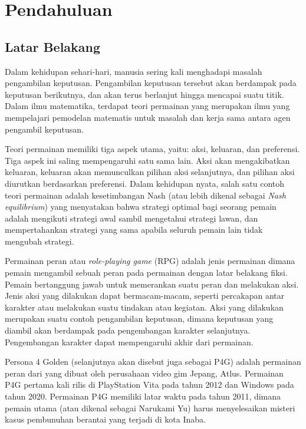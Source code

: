 \chapter{Pendahuluan}

\section{Latar Belakang}
\label{sec:latarbelakang}

Dalam kehidupan sehari-hari, manusia sering kali menghadapi masalah pengambilan keputusan. Pengambilan keputusan tersebut akan berdampak pada keputusan berikutnya, dan akan terus berlanjut hingga mencapai suatu titik. Dalam ilmu matematika, terdapat teori permainan yang merupakan ilmu yang mempelajari pemodelan matematis untuk masalah dan kerja sama antara agen pengambil keputusan.

Teori permainan memiliki tiga aspek utama, yaitu: aksi, keluaran, dan preferensi. Tiga aspek ini saling mempengaruhi satu sama lain. Aksi akan mengakibatkan keluaran, keluaran akan memunculkan pilihan aksi selanjutnya, dan pilihan aksi diurutkan berdasarkan preferensi. Dalam kehidupan nyata, salah satu contoh teori permainan adalah kesetimbangan Nash (atau lebih dikenal sebagai \textit{Nash equilibrium}) yang menyatakan bahwa strategi optimal bagi seorang pemain adalah mengikuti strategi awal sambil mengetahui strategi lawan, dan mempertahankan strategi yang sama apabila seluruh pemain lain tidak mengubah strategi.

Permainan peran atau \textit{role-playing game} (RPG) adalah jenis permainan dimana pemain mengambil sebuah peran pada permainan dengan latar belakang fiksi. Pemain bertanggung jawab untuk memerankan suatu peran dan melakukan aksi. Jenis aksi yang dilakukan dapat bermacam-macam, seperti percakapan antar karakter atau melakukan suatu tindakan atau kegiatan. Aksi yang dilakukan merupakan suatu contoh pengambilan keputusan, dimana keputusan yang diambil akan berdampak pada pengembangan karakter selanjutnya. Pengembangan karakter dapat mempengaruhi akhir dari permainan.


Persona 4 Golden (selanjutnya akan disebut juga sebagai P4G) adalah permainan peran dari yang dibuat oleh perusahaan video gim Jepang, Atlus. Permainan P4G pertama kali rilis di PlayStation Vita pada tahun 2012 dan Windows pada tahun 2020. Permainan P4G memiliki latar waktu pada tahun 2011, dimana pemain utama (atau dikenal sebagai Narukami Yu) harus menyelesaikan misteri kasus pembunuhan berantai yang terjadi di kota Inaba.

